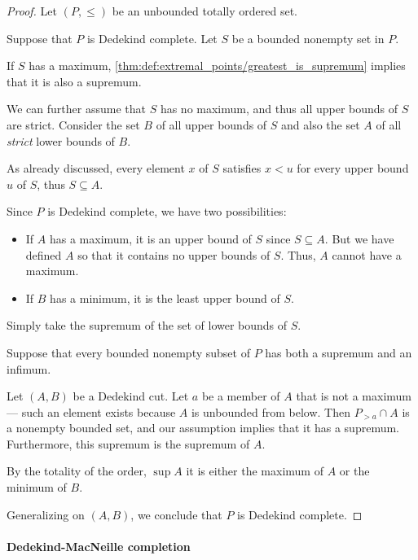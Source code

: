 \begin{proof}
  Let \( (P, \leq) \) be an unbounded totally ordered set.

  \SufficiencySubProof Suppose that \( P \) is Dedekind complete. Let \( S \) be a bounded nonempty set in \( P \).

   If \( S \) has a maximum, \cref{thm:def:extremal_points/greatest_is_supremum} implies that it is also a supremum.

  We can further assume that \( S \) has no maximum, and thus all upper bounds of \( S \) are strict. Consider the set \( B \) of all upper bounds of \( S \) and also the set \( A \) of all \emph{strict} lower bounds of \( B \).

  As already discussed, every element \( x \) of \( S \) satisfies \( x < u \) for every upper bound \( u \) of \( S \), thus \( S \subseteq A \).

  Since \( P \) is Dedekind complete, we have two possibilities:
  \begin{itemize}
    \item If \( A \) has a maximum, it is an upper bound of \( S \) since \( S \subseteq A \). But we have defined \( A \) so that it contains no upper bounds of \( S \). Thus, \( A \) cannot have a maximum.

    \item If \( B \) has a minimum, it is the least upper bound of \( S \).
  \end{itemize}

   Simply take the supremum of the set of lower bounds of \( S \).

  \NecessitySubProof Suppose that every bounded nonempty subset of \( P \) has both a supremum and an infimum.

  Let \( (A, B) \) be a Dedekind cut. Let \( a \) be a member of \( A \) that is not a maximum --- such an element exists because \( A \) is unbounded from below. Then \( P_{>a} \cap A \) is a nonempty bounded set, and our assumption implies that it has a supremum. Furthermore, this supremum is the supremum of \( A \).

  By the totality of the order, \( \sup A \) it is either the maximum of \( A \) or the minimum of \( B \).

  Generalizing on \( (A, B) \), we conclude that \( P \) is Dedekind complete.
\end{proof}

\paragraph{Dedekind-MacNeille completion}

